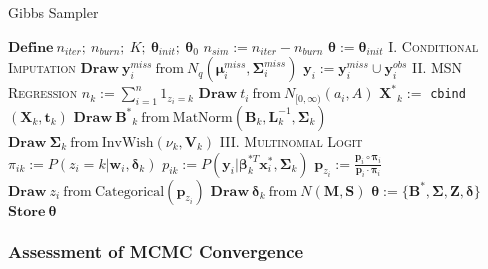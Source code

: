 \documentclass[useAMS,referee]{biom}
\begin{document}
\begin{algorithm}
\caption{Gibbs Sampler}
\label{alg:MCMC}
\begin{algorithmic}
\small
\linespread{0.5}
    \State $\mathbf{Define} \ n_{iter};\  n_{burn}; \ K; \ \boldsymbol\theta_{init}; \ \boldsymbol\theta_0$
    \State $n_{sim} := n_{iter} - n_{burn}$
    \State $\boldsymbol\theta := \boldsymbol\theta_{init}$
        \State \textsc{I. Conditional Imputation}
            \State $\mathbf{Draw} \ \mathbf{y}_i^{miss} \ \text{from} \ N_q(\boldsymbol\mu_i^{miss}, \boldsymbol\Sigma_i^{miss})$
            \State $\mathbf{y}_i := \mathbf{y}_i^{miss} \cup \mathbf{y}_i^{obs}$
         \EndFor
        \State \textsc{II. MSN Regression}
            \State $n_k := \sum_{i = 1}^n {1}_{z_i = k}$
              \State $\mathbf{Draw}\  t_i \ \text{from} \ N_{[0,\infty)}(a_i,A)$
            \EndFor
            \State $\mathbf{X^*}_k := $ \texttt{cbind}$(\mathbf{X}_k,\mathbf{t}_k)$
            \State $\mathbf{Draw} \ \mathbf{B^*}_k \ \text{from} \ \text{MatNorm}(\mathbf{B}_k,\mathbf{L}_k^{-1},\boldsymbol\Sigma_k)$
            \State $\mathbf{Draw} \ \boldsymbol\Sigma_k \ \text{from} \ \text{InvWish}(\nu_k, \mathbf{V}_k)$
          \EndFor
        \State \textsc{III. Multinomial Logit}
              \State $\pi_{ik} := P(z_i = k|\mathbf{w}_i,\boldsymbol\delta_k)$
              \State $p_{ik} := P(\mathbf{y}_i|\boldsymbol\beta_k^{*T} \mathbf{x}^*_i,\boldsymbol\Sigma_k)$
            \EndFor
            \State $\mathbf{p}_{z_i} := \frac{\mathbf{p}_i \circ \boldsymbol\pi_i}{\mathbf{p}_i \cdot \boldsymbol\pi_i}$
            \State $\mathbf{Draw} \ z_i \ \text{from} \ \text{Categorical}(\mathbf{p}_{z_i})$
              \State $\mathbf{Draw} \ \boldsymbol\delta_k \ \text{from} \ N(\mathbf{M},\mathbf{S})$
            \EndFor
          \EndFor
        \State $\boldsymbol\theta := \{\mathbf{B^*}, \boldsymbol\Sigma, \mathbf{Z}, \boldsymbol\delta \}$
        \State $\mathbf{Store} \ \boldsymbol\theta$
	  \EndFor
\end{algorithmic}
\end{algorithm}


\subsubsection{Assessment of MCMC Convergence}
\end{document}

